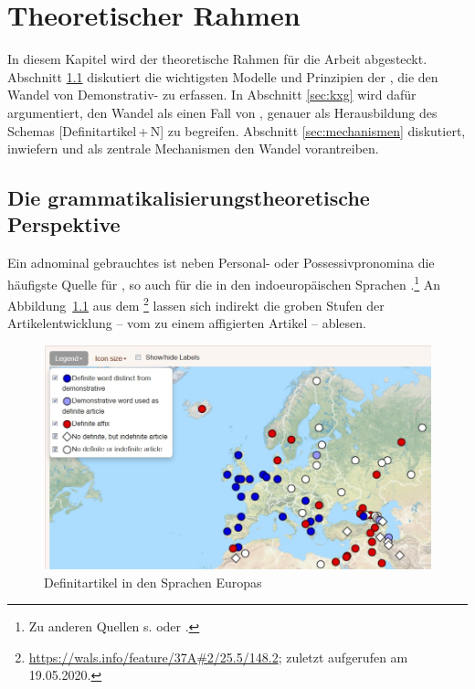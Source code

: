 \chapter{Theoretischer Rahmen} \label{chapter:theorie}

In diesem Kapitel wird der theoretische Rahmen für die Arbeit abgesteckt. 
Abschnitt \ref{sec:gram} diskutiert die wichtigsten Modelle und Prinzipien  der , die den Wandel von Demonstrativ- zu   erfassen. In Abschnitt \ref{sec:kxg} wird dafür argumentiert, den Wandel als einen Fall von , genauer als Herausbildung des Schemas  [Definitartikel\,+\,N] zu begreifen. Abschnitt \ref{sec:mechanismen} diskutiert, inwiefern  und  als zentrale Mechanismen den Wandel vorantreiben.   

\section{Die grammatikalisierungstheoretische Perspektive}\label{sec:gram}

Ein adnominal gebrauchtes  ist neben Personal-  oder Possessivpronomina   die häufigste Quelle für  \parencites()(){Himmelmann1997}[215]{Heine2002}, so auch für die  in den indoeuropäischen Sprachen \parencite{vonHeusinger2013}.\footnote{Zu anderen Quellen s. \textcite[839]{Himmelmann2001} oder \textcite[523]{deMulder2011}.}
An Abbildung~\ref{wals} aus dem \footnote{\url{https://wals.info/feature/37A\#2/25.5/148.2}; zuletzt aufgerufen am 19.05.2020.} lassen sich indirekt die groben Stufen der Artikelentwicklung -- vom  zu einem affigierten Artikel  -- ablesen. 

\begin{figure}
\begin{center}
  \includegraphics[width=\textwidth]{images/wals.jpg}
\caption {Definitartikel in den Sprachen Europas \parencite{Dryer2013}}
\label{wals}
\end{center}
\end{figure} 

